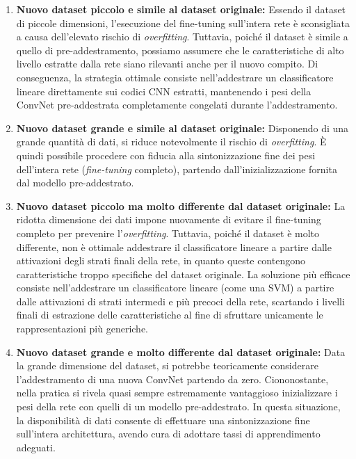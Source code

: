 ﻿\documentclass[11pt, a4paper]{article}
\begin{document}
\begin{enumerate}[leftmargin=*]
    \item \textbf{Nuovo dataset piccolo e simile al dataset originale:}
    Essendo il dataset di piccole dimensioni, l'esecuzione del fine-tuning sull'intera rete è sconsigliata a causa dell'elevato rischio di \emph{overfitting}. Tuttavia, poiché il dataset è simile a quello di pre-addestramento, possiamo assumere che le caratteristiche di alto livello estratte dalla rete siano rilevanti anche per il nuovo compito. Di conseguenza, la strategia ottimale consiste nell'addestrare un classificatore lineare direttamente sui codici CNN estratti, mantenendo i pesi della ConvNet pre-addestrata completamente congelati durante l'addestramento.

    \item \textbf{Nuovo dataset grande e simile al dataset originale:}
    Disponendo di una grande quantità di dati, si riduce notevolmente il rischio di \emph{overfitting}. È quindi possibile procedere con fiducia alla sintonizzazione fine dei pesi dell'intera rete (\emph{fine-tuning} completo), partendo dall'inizializzazione fornita dal modello pre-addestrato.

    \item \textbf{Nuovo dataset piccolo ma molto differente dal dataset originale:}
    La ridotta dimensione dei dati impone nuovamente di evitare il fine-tuning completo per prevenire l'\emph{overfitting}. Tuttavia, poiché il dataset è molto differente, non è ottimale addestrare il classificatore lineare a partire dalle attivazioni degli strati finali della rete, in quanto queste contengono caratteristiche troppo specifiche del dataset originale. La soluzione più efficace consiste nell'addestrare un classificatore lineare (come una SVM) a partire dalle attivazioni di strati intermedi e più precoci della rete, scartando i livelli finali di estrazione delle caratteristiche al fine di sfruttare unicamente le rappresentazioni più generiche.

    \item \textbf{Nuovo dataset grande e molto differente dal dataset originale:}
    Data la grande dimensione del dataset, si potrebbe teoricamente considerare l'addestramento di una nuova ConvNet partendo da zero. Ciononostante, nella pratica si rivela quasi sempre estremamente vantaggioso inizializzare i pesi della rete con quelli di un modello pre-addestrato. In questa situazione, la disponibilità di dati consente di effettuare una sintonizzazione fine sull'intera architettura, avendo cura di adottare tassi di apprendimento adeguati.
\end{enumerate}
\end{document}
